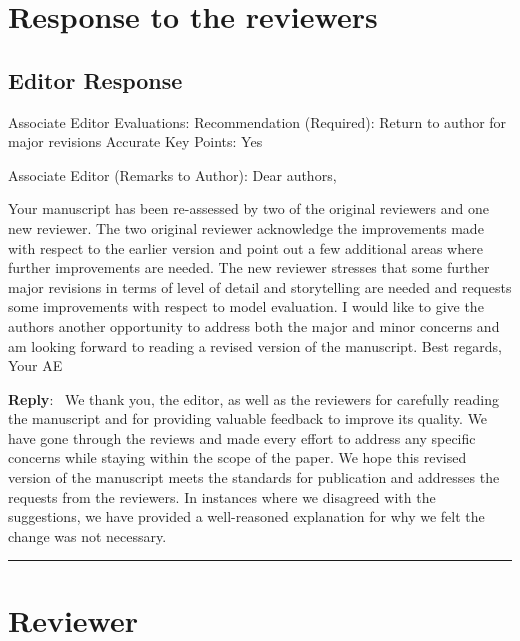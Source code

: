 \documentclass[11pt]{article}
\newcounter{reviewer}
\newcounter{point}[reviewer]
\newcommand{\reviewersection}{\stepcounter{reviewer} \bigskip \hrule
                  \section*{Reviewer \thereviewer}}
\newenvironment{reply}
   {\medskip \noindent \begin{sf}\textbf{Reply}:\  }
   {\medskip \end{sf}}
\begin{document}
\section*{Response to the reviewers}

\subsection*{Editor Response}

\noindent Associate Editor Evaluations: \newline
\noindent Recommendation (Required): Return to author for major revisions \newline
\noindent Accurate Key Points: Yes \newline

\noindent Associate Editor (Remarks to Author): \newline
\newline
\noindent Dear authors,

Your manuscript has been re-assessed by two of the original reviewers and one new reviewer.
The two original reviewer acknowledge the improvements made with respect to the earlier version and point out a few additional areas where further improvements are needed.
The new reviewer stresses that some further major revisions in terms of level of detail and storytelling are needed and requests some improvements with respect to model evaluation.
I would like to give the authors another opportunity to address both the major and minor concerns and am looking forward to reading a revised version of the manuscript. \newline
\noindent Best regards, \newline
\noindent Your AE

\begin{reply}
We thank you, the editor, as well as the reviewers for carefully reading the manuscript and for providing valuable feedback to improve its quality.
We have gone through the reviews and made every effort to address any specific concerns while staying within the scope of the paper.
We hope this revised version of the manuscript meets the standards for publication and addresses the requests from the reviewers.
In instances where we disagreed with the suggestions, we have provided a well-reasoned explanation for why we felt the change was not necessary.
\end{reply}

\clearpage
\reviewersection
\end{document}
